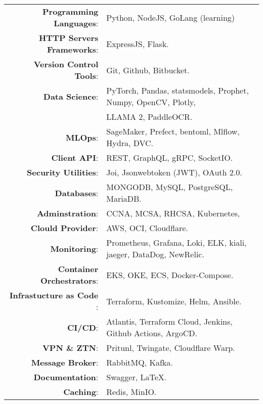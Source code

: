 \documentclass[a4paper,10pt]{article}
\begin{document}
\begin{longtable}{r p{16cm}}	
    \textbf{Programming Languages}:& Python, NodeJS, GoLang (learning)\\
    \textbf{HTTP Servers Frameworks}:& ExpressJS, Flask.\\
    \textbf{Version Control Tools}:& Git, Github, Bitbucket.\\
    \textbf{Data Science}:& PyTorch, Pandas, statsmodels, Prophet, Numpy, OpenCV, Plotly,\\
    & LLAMA 2, PaddleOCR.\\
    \textbf{MLOps}:& SageMaker, Prefect, bentoml, Mlflow, Hydra, DVC.\\
    \textbf{Client API}:& REST, GraphQL, gRPC, SocketIO.\\
    \textbf{Security Utilities}:& Joi, Jsonwebtoken (JWT), OAuth 2.0.\\ 
    \textbf{Databases}:& MONGODB, MySQL, PostgreSQL, MariaDB.\\
    \textbf{Adminstration}:& CCNA, MCSA, RHCSA, Kubernetes,\\
    \textbf{Clould Provider}:& AWS, OCI, Cloudflare. \\
    \textbf{Monitoring}:& Prometheus, Grafana, Loki, ELK, kiali, jaeger, DataDog, NewRelic.\\ 
    \textbf{Container Orchestrators}:& EKS, OKE, ECS, Docker-Compose. \\
    \textbf{Infrastucture as Code }:& Terraform, Kustomize, Helm, Ansible.\\
    \textbf{CI/CD}:& Atlantis, Terraform Cloud, Jenkins, Github Actions, ArgoCD.\\
    \textbf{VPN \& ZTN}:& Pritunl, Twingate, Cloudflare Warp. \\
    \textbf{Message Broker}:& RabbitMQ, Kafka.\\
    \textbf{Documentation}:& Swagger, \LaTeX.\\
    \textbf{Caching}:& Redis, MinIO.\\
\end{longtable}


\end{document}
